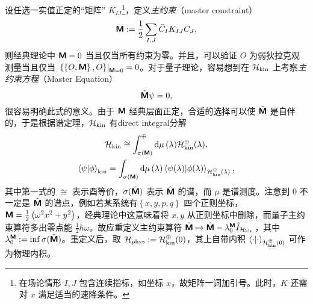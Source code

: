 		设任选一实值正定的“矩阵” $K_{IJ}$\footnote{在场论情形 $I,J$ 包含连续指标，如坐标 $x$，故矩阵一词加引号。此时，$K$ 还需对 $x$ 满足适当的速降条件。}，定义\emph{主约束}（master constraint）
		\begin{equation}
			\bm{\mathsf{M}} := \frac{1}{2} \sum_{I,J} \bar{C}_I K_{IJ} {C}_J,
		\end{equation}
		则经典理论中 $\bm{\mathsf{M}}=0$ 当且仅当所有约束为零。并且，可以验证 $O$ 为弱狄拉克观测量当且仅当 $\left. \left\{ \left\{ O, \bm{\mathsf{M}} \right\}, O \right\} \right|_{\bm{\mathsf{M}} = 0} =0$。对于量子理论，容易想到在 $\mathcal{H}_{\text{kin}}$ 上考察\emph{主约束方程}（Master Equation）
		\begin{equation}
			\hat{\bm{\mathsf{M}}} \psi = 0,
		\end{equation}
		很容易明确此式的意义。由于 $\bm{\mathsf{M}}$ 经典层面正定，合适的选择可以使 $\hat{\bm{\mathsf{M}}}$ 是自伴的，于是根据谱定理，$\mathcal{H}_{\text{kin}}$ 有direct integral分解
		\begin{equation}
			\begin{gathered}
				\Hkin \cong \int_{\sigma(\masterconstraint{M})}^{\oplus} \dd{\mu}(\lambda) \Hkin^\oplus(\lambda),\\
				\ip{\psi}{\phi}_{\text{kin}} = \int_{\sigma(\masterconstraint{M})} \dd{\mu}(\lambda) \ip{\psi(\lambda)}{\phi(\lambda)}_{\Hkin^\oplus(\lambda)},\label{eq-direct_integral}
			\end{gathered}
		\end{equation}
		其中第一式的 $\cong$ 表示酉等价，$\sigma(\hat{\bm{\mathsf{M}}})$ 表示 $\hat{\bm{\mathsf{M}}}$ 的谱，而 $\mu$ 是谱测度。注意到 $0$ 不一定是 $\hat{\bm{\mathsf{M}}}$ 的谱点，例如若某系统有$\left\{ x,y,p,q \right\}$ 四个正则坐标，$\bm{\mathsf{M}} = \frac{1}{2} \left( \omega^2 x^2+y^2 \right)$，经典理论中这意味着将 $x,y$ 从正则坐标中删除，而量子主约束算符多出零点能 $\frac{1}{2} \hbar \omega$。故应重定义主约束算符 $\hat{\bm{\mathsf{M}}} \mapsto \hat{\bm{\mathsf{M}}} - \lambda_0^{\bm{\mathsf{M}}} \hat{I}_{\mathcal{H}_{\text{kin}}}$，其中 $\lambda_0^{\bm{\mathsf{M}}} := \inf{\sigma(\hat{\ensuremath{\bm{\mathsf{M}}}})}$。重定义后，取 $\mathcal{H}_{\text{phys}} := \mathcal{H}_{\text{kin}}^\oplus(0)$，其上自带内积 $\ip{\cdot}_{\Hkin^{\oplus}(0)}$ 可作为物理内积。